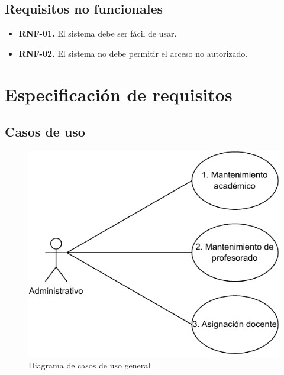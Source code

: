 \subsection{Requisitos no funcionales}
\begin{itemize}
	\item \textbf{RNF-01.} El sistema debe ser fácil de usar.
	\item \textbf{RNF-02.} El sistema no debe permitir el acceso no autorizado.

\end{itemize}

\clearpage
\section{Especificación de requisitos}
\subsection{Casos de uso}
\begin{figure}[!h]
	\centering
	\includegraphics[scale=0.85]{../img/Anexos/Casos uso/Diagrama casos de uso 1.pdf}
	\caption{Diagrama de casos de uso general}
\end{figure}
\FloatBarrier

